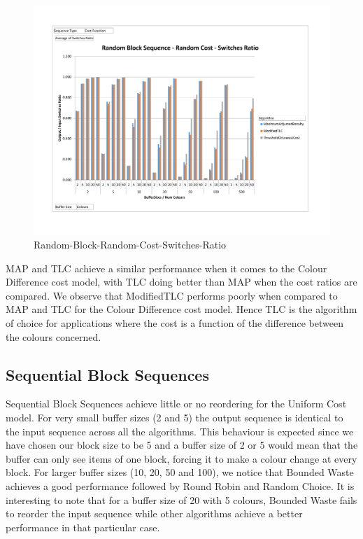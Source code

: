 \begin{figure}[ht]
\centering 
\includegraphics[scale=0.60]{Random-Block-Random-Cost-Switches.pdf}
\caption{Random-Block-Random-Cost-Switches-Ratio}
\label{RandomBlockRandomCost}
\end{figure}

MAP and TLC achieve a similar performance when it comes to the Colour Difference cost model, with TLC doing better than MAP when the cost ratios are compared. We observe that ModifiedTLC performs poorly when compared to MAP and TLC for the Colour Difference cost model. Hence TLC is the algorithm of choice for applications where the cost is a function of the difference between the colours concerned.

\subsection{Sequential Block Sequences}

Sequential Block Sequences achieve little or no reordering for the Uniform Cost model. For very small buffer sizes (2 and 5) the output sequence is identical to the input sequence across all the algorithms. This behaviour is expected since we have chosen our block size to be 5 and a buffer size of 2 or 5 would mean that the buffer can only see items of one block, forcing it to make a colour change at every block. For larger buffer sizes (10, 20, 50 and 100), we notice that Bounded Waste achieves a good performance followed by Round Robin and Random Choice. It is interesting to note that for a buffer size of 20 with 5 colours, Bounded Waste fails to reorder the input sequence while other algorithms achieve a better performance in that particular case. 

